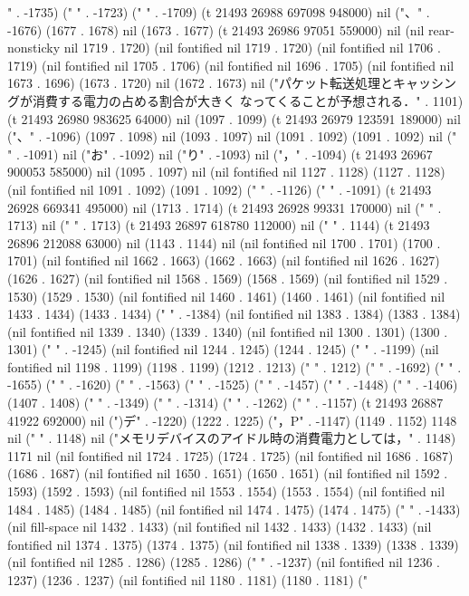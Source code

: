 " . -1735) ("
" . -1723) ("
" . -1709) (t 21493 26988 697098 948000) nil ("、" . -1676) (1677 . 1678) nil (1673 . 1677) (t 21493 26986 97051 559000) nil (nil rear-nonsticky nil 1719 . 1720) (nil fontified nil 1719 . 1720) (nil fontified nil 1706 . 1719) (nil fontified nil 1705 . 1706) (nil fontified nil 1696 . 1705) (nil fontified nil 1673 . 1696) (1673 . 1720) nil (1672 . 1673) nil ("パケット転送処理とキャッシングが消費する電力の占める割合が大きく
なってくることが予想される．" . 1101) (t 21493 26980 983625 64000) nil (1097 . 1099) (t 21493 26979 123591 189000) nil ("、" . -1096) (1097 . 1098) nil (1093 . 1097) nil (1091 . 1092) (1091 . 1092) nil ("
" . -1091) nil ("お" . -1092) nil ("り" . -1093) nil ("，" . -1094) (t 21493 26967 900053 585000) nil (1095 . 1097) nil (nil fontified nil 1127 . 1128) (1127 . 1128) (nil fontified nil 1091 . 1092) (1091 . 1092) ("
" . -1126) ("
" . -1091) (t 21493 26928 669341 495000) nil (1713 . 1714) (t 21493 26928 99331 170000) nil ("
" . 1713) nil ("
" . 1713) (t 21493 26897 618780 112000) nil ("
" . 1144) (t 21493 26896 212088 63000) nil (1143 . 1144) nil (nil fontified nil 1700 . 1701) (1700 . 1701) (nil fontified nil 1662 . 1663) (1662 . 1663) (nil fontified nil 1626 . 1627) (1626 . 1627) (nil fontified nil 1568 . 1569) (1568 . 1569) (nil fontified nil 1529 . 1530) (1529 . 1530) (nil fontified nil 1460 . 1461) (1460 . 1461) (nil fontified nil 1433 . 1434) (1433 . 1434) (" " . -1384) (nil fontified nil 1383 . 1384) (1383 . 1384) (nil fontified nil 1339 . 1340) (1339 . 1340) (nil fontified nil 1300 . 1301) (1300 . 1301) (" " . -1245) (nil fontified nil 1244 . 1245) (1244 . 1245) (" " . -1199) (nil fontified nil 1198 . 1199) (1198 . 1199) (1212 . 1213) ("
" . 1212) ("
" . -1692) ("
" . -1655) ("
" . -1620) ("
" . -1563) ("
" . -1525) ("
" . -1457) ("
" . -1448) ("
" . -1406) (1407 . 1408) ("
" . -1349) ("
" . -1314) ("
" . -1262) ("
" . -1157) (t 21493 26887 41922 692000) nil (")デ" . -1220) (1222 . 1225) ("，P" . -1147) (1149 . 1152) 1148 nil (" " . 1148) nil ("メモリデバイスのアイドル時の消費電力としては，" . 1148) 1171 nil (nil fontified nil 1724 . 1725) (1724 . 1725) (nil fontified nil 1686 . 1687) (1686 . 1687) (nil fontified nil 1650 . 1651) (1650 . 1651) (nil fontified nil 1592 . 1593) (1592 . 1593) (nil fontified nil 1553 . 1554) (1553 . 1554) (nil fontified nil 1484 . 1485) (1484 . 1485) (nil fontified nil 1474 . 1475) (1474 . 1475) (" " . -1433) (nil fill-space nil 1432 . 1433) (nil fontified nil 1432 . 1433) (1432 . 1433) (nil fontified nil 1374 . 1375) (1374 . 1375) (nil fontified nil 1338 . 1339) (1338 . 1339) (nil fontified nil 1285 . 1286) (1285 . 1286) (" " . -1237) (nil fontified nil 1236 . 1237) (1236 . 1237) (nil fontified nil 1180 . 1181) (1180 . 1181) ("
